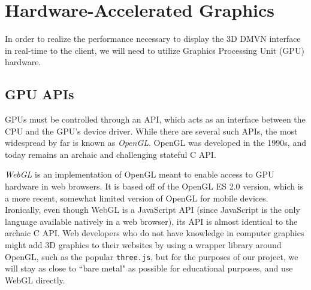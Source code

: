 \section{Hardware-Accelerated Graphics}
In order to realize the performance necessary to display the 3D DMVN interface in real-time to the client, we will need to utilize Graphics Processing Unit (GPU) hardware.

\subsection{GPU APIs}
GPUs must be controlled through an API, which acts as an interface between the CPU and the GPU's device driver. While there are several such APIs, the most widespread by far is known as \emph{OpenGL}.\cite{opengl} OpenGL was developed in the 1990s, and today remains an archaic and challenging stateful C API.
\par \emph{WebGL} is an implementation of OpenGL meant to enable access to GPU hardware in web browsers. It is based off of the OpenGL ES 2.0 version\cite{opengles2}, which is a more recent, somewhat limited version of OpenGL for mobile devices. Ironically, even though WebGL is a JavaScript API (since JavaScript is the only language available natively in a web browser), its API is almost identical to the archaic C API. Web developers who do not have knowledge in computer graphics might add 3D graphics to their websites by using a wrapper library around OpenGL, such as the popular \texttt{three.js}, but for the purposes of our project, we will stay as close to ``bare metal" as possible for educational purposes, and use WebGL directly.

